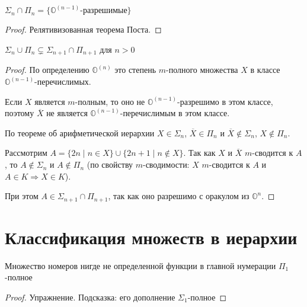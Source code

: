 \begin{cor}
	$ \Sigma_n \cap \Pi_n = \{\mathbb{O}^{(n-1)} \text{-разрешимые}\}$
\end{cor}
\begin{proof}
    Релятивизованная теорема Поста.
\end{proof}
\begin{cor}
    $ \Sigma_n \cup \Pi_n \subsetneq \Sigma_{n+1} \cap \Pi_{n+1}$ для $ n > 0$
\end{cor}
\begin{proof}
	По определению $ \mathbb{O}^{(n)}$ это степень $ m$-полного множества  $ X$ в классе  $ \mathbb{O}^{(n-1)}$-перечислимых.

	Если $ X$ является $ m$-полным, то оно не $ \mathbb{O}^{(n-1)}$-разрешимо в этом классе, поэтому $ \overline{X}$ не является $ \mathbb{O}^{(n-1)}$-перечислимым в этом классе.

	По теореме об арифметической иерархии $ X \in \Sigma_n$, $ \overline{X} \in \Pi_n$ и $\overline{X} \notin \Sigma_n$, $ X \notin \Pi_n$.

	Рассмотрим $ A = \{2n \mid n \in X\} \cup \{2n+1 \mid n \notin X\}$. Так как $ X$ и $ \overline X$ $ m$-сводится к $ A$, то $ A \notin \Sigma_n$ и $ A \notin \Pi_n$ (по свойству $m$-сводимости: $ X$ $ m$-сводится к $ A$ и $ A \in K \Longrightarrow X \in K$).

	При этом $ A \in \Sigma_{n+1} \cap \Pi_{n+1}$, так как оно разрешимо с оракулом из $ \mathbb{O}^{n}$.
\end{proof}


\section{Классификация множеств в иерархии}
\begin{thm}
    Множество номеров нигде не определенной функции в главной нумерации $ \Pi_1$-полное
\end{thm}
\begin{proof}
    Упражнение. Подсказка: его дополнение $ \Sigma_1$-полное
\end{proof}

